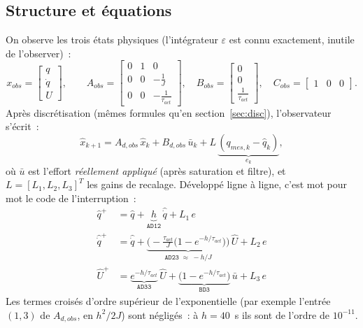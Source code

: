 \documentclass[a4paper,11pt]{article}
\newcommand{\qm}{q}
\begin{document}
\subsection{Structure et équations}

On observe les trois états physiques (l'intégrateur $\varepsilon$ est connu
exactement, inutile de l'observer)~:
\begin{equation}
    x_{obs} = \begin{bmatrix} \qm \\ \dot{\qm} \\ U \end{bmatrix},
    \qquad
    A_{obs} = \begin{bmatrix}
        0 & 1 & 0 \\ 0 & 0 & -\frac{1}{J} \\ 0 & 0 & -\frac{1}{\tau_{act}}
    \end{bmatrix},
    \quad
    B_{obs} = \begin{bmatrix} 0 \\ 0 \\ \frac{1}{\tau_{act}} \end{bmatrix},
    \quad
    C_{obs} = \begin{bmatrix} 1 & 0 & 0 \end{bmatrix}.
\end{equation}
Après discrétisation (mêmes formules qu'en section~\ref{sec:disc}),
l'observateur s'écrit~:
\begin{equation}
    \hat{x}_{k+1} = A_{d,obs}\,\hat{x}_k + B_{d,obs}\,\bar u_k
                    + L\,\underbrace{(\qm_{mes,k} - \hat{\qm}_k)}_{e_k},
    \label{eq:obs}
\end{equation}
où $\bar u$ est l'effort \emph{réellement appliqué} (après saturation et
filtre), et $L = [L_1, L_2, L_3]^T$ les gains de recalage. Développé ligne à
ligne, c'est mot pour mot le code de l'interruption~:
\begin{equation}
    \begin{aligned}
        \hat{\qm}^{+}      &= \hat{\qm} + \underbrace{h}_{\texttt{AD12}}\,\hat{\dot q} + L_1\,e \\
        \hat{\dot q}^{+}   &= \hat{\dot q} + \underbrace{\Big(-\tfrac{\tau_{act}}{J}\big(1 - e^{-h/\tau_{act}}\big)\Big)}_{\texttt{AD23}\;\approx\; -h/J}\,\hat{U} + L_2\,e \\
        \hat{U}^{+}        &= \underbrace{e^{-h/\tau_{act}}}_{\texttt{AD33}}\,\hat{U} + \underbrace{\big(1 - e^{-h/\tau_{act}}\big)}_{\texttt{BD3}}\,\bar u + L_3\,e
    \end{aligned}
\end{equation}
Les termes croisés d'ordre supérieur de l'exponentielle (par exemple l'entrée
$(1,3)$ de $A_{d,obs}$, en $h^2/2J$) sont négligés~: à $h = 40$~\textmu s ils
sont de l'ordre de $10^{-11}$.
\end{document}
